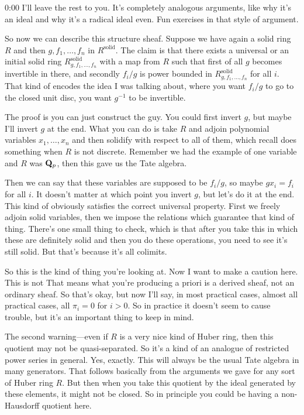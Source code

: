 \begin{unfinished}{0:00}
I'll leave the rest to you. It's completely analogous arguments, like why it's an ideal and why it's a radical ideal even. Fun exercises in that style of argument.

So now we can describe this structure sheaf. Suppose we have again a solid ring $R$ and then $g, f_1, \dots, f_n$ in $R^\mathrm{solid}$. The claim is that there exists a universal or an initial solid ring $R^\mathrm{solid}_{g,f_1,\dots,f_n}$ with a map from $R$ such that first of all $g$ becomes invertible in there, and secondly $f_i/g$ is power bounded in $R^\mathrm{solid}_{g,f_1,\dots,f_n}$ for all $i$. That kind of encodes the idea I was talking about, where you want $f_i/g$ to go to the closed unit disc, you want $g^{-1}$ to be invertible.

The proof is you can just construct the guy. You could first invert $g$, but maybe I'll invert $g$ at the end. What you can do is take $R$ and adjoin polynomial variables $x_1, \dots, x_n$ and then solidify with respect to all of them, which recall does something when $R$ is not discrete. Remember we had the example of one variable and $R$ was $\mathbf Q_p$, then this gave us the Tate algebra.

Then we can say that these variables are supposed to be $f_i/g$, so maybe $gx_i = f_i$ for all $i$. It doesn't matter at which point you invert $g$, but let's do it at the end. This kind of obviously satisfies the correct universal property. First we freely adjoin solid variables, then we impose the relations which guarantee that kind of thing. There's one small thing to check, which is that after you take this in which these are definitely solid and then you do these operations, you need to see it's still solid. But that's because it's all colimits.

So this is the kind of thing you're looking at. Now I want to make a caution here. This is not
That means what you're producing a priori is a derived sheaf, not an ordinary sheaf. So that's okay, but now I'll say, in most practical cases, almost all practical cases, all $\pi_i = 0$ for $i > 0$. So in practice it doesn't seem to cause trouble, but it's an important thing to keep in mind.

The second warning---even if $R$ is a very nice kind of Huber ring, then this quotient may not be quasi-separated. So it's a kind of an analogue of restricted power series in general. Yes, exactly. This will always be the usual Tate algebra in many generators. That follows basically from the arguments we gave for any sort of Huber ring $R$. But then when you take this quotient by the ideal generated by these elements, it might not be closed. So in principle you could be having a non-Hausdorff quotient here.


\end{unfinished}
